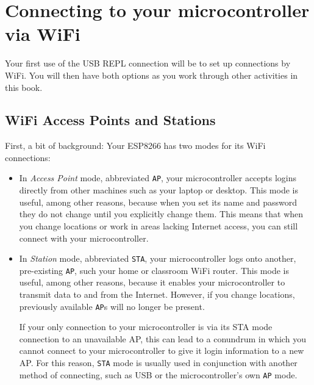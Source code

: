 	  
	  
\section{Connecting to your microcontroller via WiFi}
Your first use of the USB REPL connection will be to set up connections by WiFi. 
You will then have both options as you work through other activities in this book.

\subsection{WiFi Access Points and Stations}
First, a bit of background: Your ESP8266 has two modes for its WiFi connections: 
\begin{itemize}
	\item In \emph{Access Point} mode, abbreviated \texttt{AP}, your microcontroller accepts logins directly from other machines such as your laptop or desktop. 
	This mode is useful, among other reasons, because when you set its name and password they do not change until you explicitly change them. 
	This means that when you change locations or work in areas lacking Internet access, you can still connect with your microcontroller. 
	
	\item In \emph{Station} mode, abbreviated \texttt{STA}, your microcontroller logs onto another, pre-existing \texttt{AP}, such your home or classroom WiFi router.
	This mode is useful, among other reasons, because it enables your microcontroller to transmit data to and from the Internet. 
	However, if you change locations, previously available \texttt{AP}s will no longer be present.
	
	\smallskip
	If your only connection to your microcontroller is via its STA mode connection to an unavailable AP, this can lead to a conundrum in which you cannot connect to your microcontroller to give it login information to a new AP. 
	For this reason, \texttt{STA} mode is usually used in conjunction with another method of connecting, such as USB or the microcontroller's own \texttt{AP} mode.

\end{itemize}

